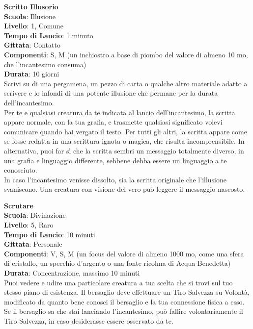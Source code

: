 \begin{multicols}{2}
\medskip\textbf{Scritto Illusorio}\\
\textbf{Scuola}: Illusione\\
\textbf{Livello}: 1, Comune\\
\textbf{Tempo di Lancio}: 1 minuto\\
\textbf{Gittata}: Contatto\\
\textbf{Componenti}: S, M (un inchiostro a base di piombo del valore di almeno 10 mo, che l'incantesimo consuma)\\
\textbf{Durata}: 10 giorni\\
Scrivi su di una pergamena, un pezzo di carta o qualche altro materiale adatto a scrivere e lo infondi di una potente illusione che permane per la durata dell'incantesimo.\\
Per te e qualsiasi creatura da te indicata al lancio dell'incantesimo, la scritta appare normale, con la tua grafia, e trasmette qualsiasi significato volevi comunicare quando hai vergato il testo. Per tutti gli altri, la scritta appare come se fosse redatta in una scrittura ignota o magica, che risulta incomprensibile. In alternativa, puoi far sì che la scritta sembri un messaggio totalmente diverso, in una grafia e linguaggio differente, sebbene debba essere un linguaggio a te conosciuto.\\
In caso l'incantesimo venisse dissolto, sia la scritta originale che l'illusione svaniscono. Una creatura con visione del vero può leggere il messaggio nascosto.

\medskip\textbf{Scrutare}\\
\textbf{Scuola}: Divinazione\\
\textbf{Livello}: 5, Raro\\
\textbf{Tempo di Lancio}: 10 minuti\\
\textbf{Gittata}: Personale\\
\textbf{Componenti}: V, S, M (un focus del valore di almeno 1000 mo, come una sfera di cristallo, un specchio d'argento o una fonte ricolma di Acqua Benedetta)\\
\textbf{Durata}: Concentrazione, massimo 10 minuti\\
Puoi vedere e udire una particolare creatura a tua scelta che si trovi sul tuo stesso piano di esistenza. Il bersaglio deve effettuare un Tiro Salvezza su Volontà, modificato da quanto bene conosci il bersaglio e la tua connessione fisica a esso. Se il bersaglio sa che stai lanciando l'incantesimo, può fallire volontariamente il Tiro Salvezza, in caso desiderasse essere osservato da
te.


\end{multicols}
